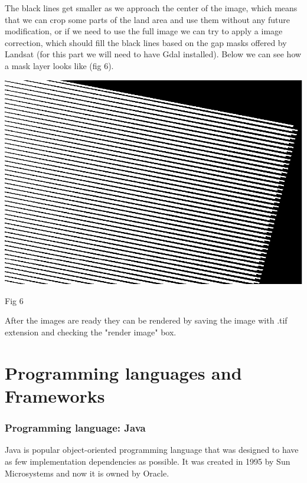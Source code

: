 \documentclass[12pt, a4paper]{report}
\begin{document}
\quad
The black lines get smaller as we approach the center of the image, which means that we can crop some parts of the land area and use them without any future modification, or if we need to use the full image we can try to apply a image correction, which should fill the black lines based on the gap masks offered by Landsat (for this part we will need to have Gdal installed). Below we can see how a mask layer looks like (fig 6).
\par 


\medskip

\includegraphics[scale=0.54, center]{landsat_black_stripes_correction.png} 
\begin{center}
Fig 6
\end{center}
\par 

After the images are ready they can be rendered by saving the image with .tif extension and checking the "render image" box.



\section{Programming languages and Frameworks} 

\subsubsection{Programming language: Java}
\medskip

\quad
Java is popular object-oriented programming language that was designed to have as few implementation dependencies as possible. It was created in 1995 by Sun Microsystems and now it is owned by Oracle.
\par
\end{document}
